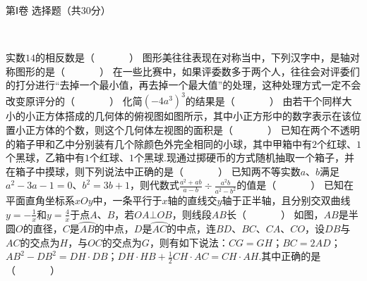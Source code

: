 \documentclass[10pt]{article}
\begin{document}
\showsecret
{}
\mathtxt
\paperinformation
\centerline{\large \heiti 第Ⅰ卷 \quad 选择题（共30分）} \par \ \par

\begin{questions}{\selectingintroduction}
    \question 实数$14$的相反数是（~~~~~~~）
    \question 图形美往往表现在对称当中，下列汉字中，是轴对称图形的是（~~~~~~~）
    \question 在一些比赛中，如果评委数多于两个人，往往会对评委们的打分进行``去掉一个最小值，再去掉一个最大值''的处理，这种处理方式一定不会改变原评分的（~~~~~~~）
    \question 化简$(-4a^3)^3$的结果是（~~~~~~~）
    \question 由若干个同样大小的小正方体搭成的几何体的俯视图如图所示，其中小正方形中的数字表示在该位置小正方体的个数，则这个几何体左视图的面积是（~~~~~~~）
    \question 已知在两个不透明的箱子甲和乙中分别装有几个除颜色外完全相同的小球，其中甲箱中有$2$个红球、$1$个黑球，乙箱中有$1$个红球、$1$个黑球.现通过掷硬币的方式随机抽取一个箱子，并在箱子中摸球，则下列说法中正确的是（~~~~~~~）
    \question 已知两不等实数$a$、$b$满足$a^2-3a-1=0$、$b^2=3b+1$，则代数式$\frac{a^2+ab}{a-b} \div \frac{a^2b}{a^2-b^2}$的值是（~~~~~~~）
    \question 已知在平面直角坐标系$xOy$中，一条平行于$x$轴的直线交$y$轴于正半轴，且分别交双曲线$y=-\frac{1}{x}$和$y=\frac{4}{x}$于点$A$、$B$，若$OA \bot OB$，则线段$AB$长（~~~~~~~）
    \question 如图，$AB$是半圆$O$的直径，$C$是$\wideparen{AB}$的中点，$D$是$\wideparen{AC}$的中点，连$BD$、$BC$、$CA$、$CO$，设$DB$与$AC$的交点为$H$，与$OC$的交点为$G$，则有如下说法：$CG=GH$；$BC=2AD$；$AB^2-DB^2=DH \cdot DB$；$DH \cdot HB + \frac{1}{2}CH \cdot AC = CH \cdot AH.$其中正确的是（~~~~~~~）
    \begin{figure}[!htb]
        \centering
        \subfigure[（第5题）]{
}
\end{figure}
\end{questions}
\end{document}
